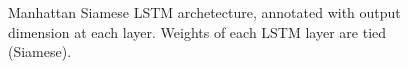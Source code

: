 \documentclass[letterpaper, 10 pt, conference]{ieeeconf}  %
\begin{document}
   \begin{figure}[thpb]
      \centering
      \caption{Manhattan Siamese LSTM archetecture, annotated with output dimension at each layer. Weights of each LSTM layer are tied (Siamese).}
      \label{figurelabel}
   \end{figure}
\end{document}
